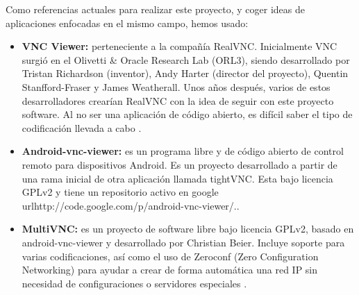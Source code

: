 Como referencias actuales para realizar este proyecto, y coger ideas de aplicaciones enfocadas en el mismo campo, hemos usado:
\begin{itemize}
\item \textbf{VNC Viewer:} perteneciente a la compañía RealVNC. Inicialmente VNC surgió en el Olivetti \& Oracle Research Lab (ORL3), siendo desarrollado por Tristan Richardson (inventor), Andy Harter (director del proyecto), Quentin Stanfford-Fraser y James Weatherall. Unos años después, varios de estos desarrolladores crearían RealVNC con la idea de seguir con este proyecto software. Al no ser una aplicación de código abierto, es difícil saber el tipo de codificación llevada a cabo \cite{wiki:realvnc}.
\item \textbf{Android-vnc-viewer:} es un programa libre y de código abierto de control remoto para dispositivos Android. Es un proyecto desarrollado a partir de una rama inicial de otra aplicación llamada tightVNC. Esta bajo licencia GPLv2 y tiene un repositorio activo en google url{http://code.google.com/p/android-vnc-viewer/}.\cite{androidvnc:androidvnc}.
\item \textbf{MultiVNC:} es un proyecto de software libre bajo licencia GPLv2,  basado en android-vnc-viewer y desarrollado por Christian Beier. Incluye soporte para varias codificaciones, así como el uso de Zeroconf (Zero Configuration Networking) para ayudar a crear de forma automática una red IP sin necesidad de configuraciones o servidores especiales \cite{multivnc:multivnc}.
\end{itemize}
